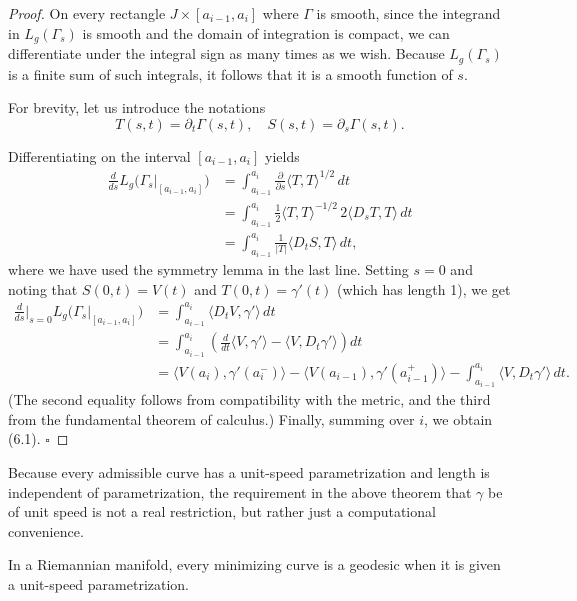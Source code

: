 \begin{proof}
On every rectangle $J \times [a_{i-1}, a_i]$ where $\Gamma$ is smooth, since the integrand in $L_g(\Gamma_s)$ is smooth and the domain of integration is compact, we can differentiate under the integral sign as many times as we wish. Because $L_g(\Gamma_s)$ is a finite sum of such integrals, it follows that it is a smooth function of $s$.

For brevity, let us introduce the notations
\[
T(s,t) = \partial_t \Gamma(s,t), \quad S(s,t) = \partial_s \Gamma(s,t).
\]

Differentiating on the interval $[a_{i-1}, a_i]$ yields
\begin{align*}
\frac{d}{ds} L_g\bigl(\Gamma_s|_{[a_{i-1}, a_i]}\bigr) &= \int_{a_{i-1}}^{a_i} \frac{\partial}{\partial s} \langle T, T\rangle^{1/2} \, dt \\
&= \int_{a_{i-1}}^{a_i} \tfrac{1}{2}\langle T,T\rangle^{-1/2} \, 2\langle D_s T, T\rangle \, dt \\
&= \int_{a_{i-1}}^{a_i} \frac{1}{|T|} \langle D_t S, T\rangle \, dt, \tag{6.3}
\end{align*}
where we have used the symmetry lemma in the last line. Setting $s = 0$ and noting that $S(0,t) = V(t)$ and $T(0,t) = \gamma'(t)$ (which has length 1), we get
\begin{align*}
\frac{d}{ds}\bigg|_{s=0} L_g\bigl(\Gamma_s|_{[a_{i-1},a_i]}\bigr)
&= \int_{a_{i-1}}^{a_i} \langle D_t V, \gamma' \rangle \, dt \\
&= \int_{a_{i-1}}^{a_i} \left(\frac{d}{dt}\langle V, \gamma' \rangle - \langle V, D_t \gamma' \rangle\right) dt \\
&= \langle V(a_i), \gamma'(a_i^-) \rangle - \langle V(a_{i-1}), \gamma'(a_{i-1}^+) \rangle - \int_{a_{i-1}}^{a_i} \langle V, D_t \gamma' \rangle \, dt.
\end{align*}
(The second equality follows from compatibility with the metric, and the third from the fundamental theorem of calculus.) Finally, summing over $i$, we obtain (6.1). $\square$
\end{proof}

Because every admissible curve has a unit-speed parametrization and length is independent of parametrization, the requirement in the above theorem that $\gamma$ be of unit speed is not a real restriction, but rather just a computational convenience.

\begin{theorem}
\label{thm:minimizing-geodesic-unit-speed}

In a Riemannian manifold, every minimizing curve is a geodesic when it is given a unit-speed parametrization.
\end{theorem}

